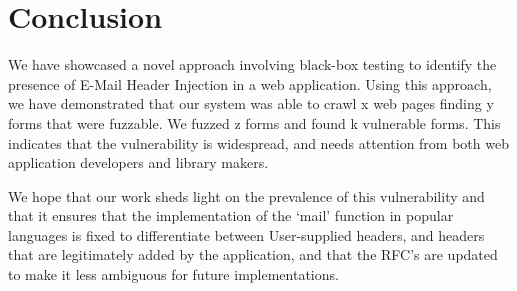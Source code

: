 \chapter{Conclusion}
We have showcased a novel approach involving black-box testing to identify the presence of E-Mail Header Injection in a web application. Using this approach, we have demonstrated that our system was able to crawl {x} web pages finding {y} forms that were fuzzable. We fuzzed {z} forms and found {k} vulnerable forms. This indicates that the vulnerability is widespread, and needs attention from both web application developers and library makers. 

We hope that our work sheds light on the prevalence of this vulnerability and that it ensures that the implementation of the `mail' function in popular languages is fixed to differentiate between User-supplied headers, and headers that are legitimately added by the application, and that the RFC's are updated to make it less ambiguous for future implementations. 